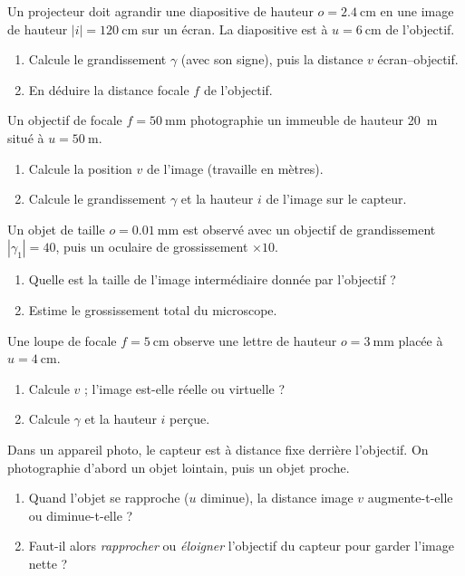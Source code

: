 \documentclass[11pt,a4paper]{article}
\begin{document}

\begin{exo}
Un projecteur doit agrandir une diapositive de hauteur $o=\qty{2.4}{\cm}$ en une image de hauteur
$|i|=\qty{120}{\cm}$ sur un écran. La diapositive est à $u=\qty{6}{\cm}$ de l'objectif.
\begin{enumerate}[label=\alph*)]
  \item Calcule le grandissement $\gamma$ (avec son signe), puis la distance $v$ écran--objectif.
  \item En déduire la distance focale $f$ de l'objectif.
\end{enumerate}
\end{exo}

\begin{exo}
Un objectif de focale $f=\qty{50}{\mm}$ photographie un immeuble de hauteur \qty{20}{\m} situé à
$u=\qty{50}{\m}$.
\begin{enumerate}[label=\alph*)]
  \item Calcule la position $v$ de l'image (travaille en mètres).
  \item Calcule le grandissement $\gamma$ et la hauteur $i$ de l'image sur le capteur.
\end{enumerate}
\end{exo}

\begin{exo}
Un objet de taille $o=\qty{0.01}{\mm}$ est observé avec un objectif de grandissement $|\gamma_1|=40$,
puis un oculaire de grossissement $\times 10$.
\begin{enumerate}[label=\alph*)]
  \item Quelle est la taille de l'image intermédiaire donnée par l'objectif ?
  \item Estime le grossissement total du microscope.
\end{enumerate}
\end{exo}

\begin{exo}
Une loupe de focale $f=\qty{5}{\cm}$ observe une lettre de hauteur $o=\qty{3}{\mm}$ placée à
$u=\qty{4}{\cm}$.
\begin{enumerate}[label=\alph*)]
  \item Calcule $v$ ; l'image est-elle réelle ou virtuelle ?
  \item Calcule $\gamma$ et la hauteur $i$ perçue.
\end{enumerate}
\end{exo}

\begin{exo}
Dans un appareil photo, le capteur est à distance fixe derrière l'objectif. On photographie d'abord un
objet lointain, puis un objet proche.
\begin{enumerate}[label=\alph*)]
  \item Quand l'objet se rapproche ($u$ diminue), la distance image $v$ augmente-t-elle ou diminue-t-elle ?
  \item Faut-il alors \emph{rapprocher} ou \emph{éloigner} l'objectif du capteur pour garder l'image nette ?
\end{enumerate}
\end{exo}
\end{document}

